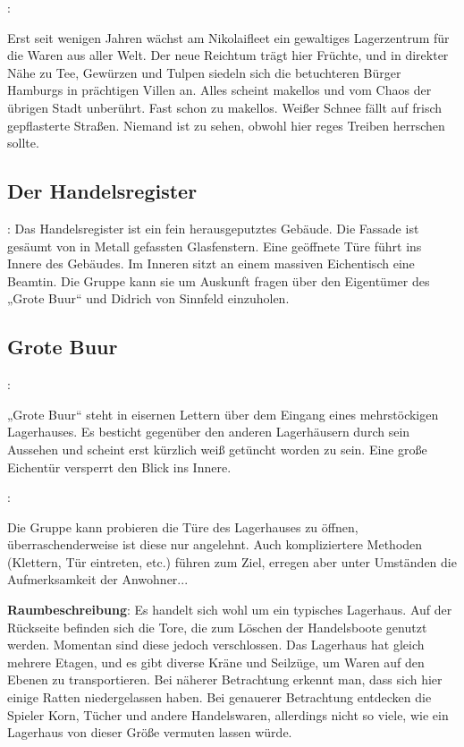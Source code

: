 :

Erst seit wenigen Jahren wächst am Nikolaifleet ein gewaltiges Lagerzentrum für die Waren aus aller Welt. Der neue Reichtum trägt hier Früchte, und in direkter Nähe zu Tee, Gewürzen und Tulpen siedeln sich die betuchteren Bürger Hamburgs in prächtigen Villen an. Alles scheint makellos und vom Chaos der übrigen Stadt unberührt. Fast schon zu makellos. Weißer Schnee fällt auf frisch gepflasterte Straßen. Niemand ist zu sehen, obwohl hier reges Treiben herrschen sollte.

\subsection{Der Handelsregister}
\label{handelsregister}

:
Das Handelsregister ist ein fein herausgeputztes Gebäude. Die Fassade ist gesäumt von in Metall gefassten Glasfenstern. Eine geöffnete Türe führt ins Innere des Gebäudes. Im Inneren sitzt an einem
massiven Eichentisch eine Beamtin. Die Gruppe kann sie um Auskunft fragen über den Eigentümer des „Grote Buur“ und Didrich von Sinnfeld einzuholen.

\subsection*{Grote Buur}
\label{"grote buur"}

:

„Grote Buur“ steht in eisernen Lettern über dem Eingang eines mehrstöckigen Lagerhauses. Es besticht gegenüber den anderen Lagerhäusern durch sein Aussehen und scheint erst kürzlich weiß getüncht worden zu sein. Eine große Eichentür versperrt den Blick ins Innere.

:

Die Gruppe kann probieren die Türe des Lagerhauses zu öffnen, überraschenderweise ist diese nur angelehnt. Auch kompliziertere Methoden (Klettern, Tür eintreten, etc.) führen zum Ziel, erregen aber unter Umständen die Aufmerksamkeit der Anwohner...

\textbf{Raumbeschreibung}: Es handelt sich wohl um ein typisches Lagerhaus. Auf der Rückseite befinden sich die Tore, die zum Löschen der Handelsboote genutzt werden. Momentan sind diese jedoch verschlossen. Das Lagerhaus hat gleich mehrere Etagen, und es gibt diverse Kräne und Seilzüge, um Waren auf den Ebenen zu transportieren. Bei näherer Betrachtung erkennt man, dass sich hier einige Ratten niedergelassen haben. Bei genauerer Betrachtung entdecken die Spieler Korn, Tücher und andere Handelswaren, allerdings nicht so viele, wie ein Lagerhaus von dieser Größe vermuten lassen würde.

